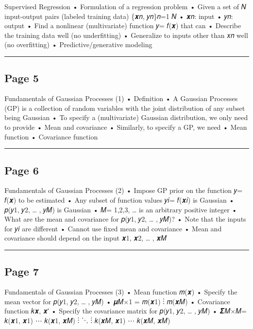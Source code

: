 \documentclass[
]{article}
\begin{document}
Supervised Regression • Formulation of a regression problem • Given a
set of 𝑁 input-output pairs (labeled training data) \{𝒙𝑛, 𝑦𝑛\}𝑛=1 𝑁 •
𝒙𝑛: input • 𝑦𝑛: output • Find a nonlinear (multivariate) function 𝑦=
𝑓(𝒙) that can • Describe the training data well (no underfitting) •
Generalize to inputs other than 𝑥𝑛 well (no overfitting) •
Predictive/generative modeling

\begin{center}\rule{0.5\linewidth}{0.5pt}\end{center}

\subsection{Page 5}\label{page-5}

Fundamentals of Gaussian Processes (1) • Definition • A Gaussian
Processes (GP) is a collection of random variables with the joint
distribution of any subset being Gaussian • To specify a (multivariate)
Gaussian distribution, we only need to provide • Mean and covariance •
Similarly, to specify a GP, we need • Mean function • Covariance
function

\begin{center}\rule{0.5\linewidth}{0.5pt}\end{center}

\subsection{Page 6}\label{page-6}

Fundamentals of Gaussian Processes (2) • Impose GP prior on the function
𝑦= 𝑓(𝒙) to be estimated • Any subset of function values 𝑦𝑖= 𝑓(𝒙𝑖) is
Gaussian • 𝑝(𝑦1, 𝑦2, \ldots{} , 𝑦𝑀) is Gaussian • 𝑀= 1,2,3, \ldots{} is
an arbitrary positive integer • What are the mean and covariance for
𝑝(𝑦1, 𝑦2, \ldots{} , 𝑦𝑀)? • Note that the inputs for 𝑦𝑖 are different •
Cannot use fixed mean and covariance • Mean and covariance should depend
on the input 𝒙1, 𝒙2, \ldots{} , 𝒙𝑀

\begin{center}\rule{0.5\linewidth}{0.5pt}\end{center}

\subsection{Page 7}\label{page-7}

Fundamentals of Gaussian Processes (3) • Mean function 𝑚(𝒙) • Specify
the mean vector for 𝑝(𝑦1, 𝑦2, \ldots{} , 𝑦𝑀) • 𝝁𝑀×1 = 𝑚(𝒙1) ⋮ 𝑚(𝒙𝑀) •
Covariance function 𝑘𝒙, 𝒙′ • Specify the covariance matrix for 𝑝(𝑦1, 𝑦2,
\ldots{} , 𝑦𝑀) • 𝜮𝑀×𝑀= 𝑘(𝒙1, 𝒙1) ⋯ 𝑘(𝒙1, 𝒙𝑀) ⋮ ⋱ ⋮ 𝑘(𝒙𝑀, 𝒙1) ⋯ 𝑘(𝒙𝑀, 𝒙𝑀)
\end{document}
